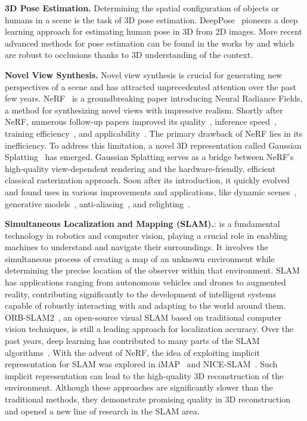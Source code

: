 \vspace{1ex}
\noindent\textbf{3D Pose Estimation.} Determining the spatial configuration of objects or humans in a scene is the task of 3D pose estimation. DeepPose~\citep{toshev2014deeppose} pioneers a deep learning approach for estimating human pose in 3D from 2D images. More recent advanced methods for pose estimation can be found in the works by \cite{zhang20233d} and \cite{zhou2023deep} which are robust to occlusions thanks to 3D understanding of the context.

\vspace{1ex}
\noindent\textbf{Novel View Synthesis.}
Novel view synthesis is crucial for generating new perspectives of a scene and has attracted unprecedented attention over the past few years. NeRF~\citep{mildenhall2020nerf} is a groundbreaking paper introducing Neural Radiance Fields, a method for synthesizing novel views with impressive realism. Shortly after NeRF, numerous follow-up papers improved its quality~\citep{Barron_2021_ICCV, hu2023tri}, inference speed~\citep{fridovich2022plenoxels, garbin2021fastnerf}, training efficiency~\citep{sun2022direct, muller2022instant}, and applicability~\citep{meshry2019neural, park2021nerfies, chan2022efficient}. The primary drawback of NeRF lies in its inefficiency. To address this limitation, a novel 3D representation called Gaussian Splatting~\citep{kerbl20233d} has emerged. Gaussian Splatting serves as a bridge between NeRF's high-quality view-dependent rendering and the hardware-friendly, efficient classical rasterization approach. Soon after its introduction, it quickly evolved and found uses in various improvements and applications, like dynamic scenes~\citep{luiten2023dynamic,yang2023deformable}, generative models~\citep{chen2023text,tang2023dreamgaussian}, anti-aliasing~\citep{yu2023mip}, and relighting~\citep{gao2023relightable}.

\vspace{1ex}
\noindent\textbf{Simultaneous Localization and Mapping (SLAM).}:  is a fundamental technology in robotics and computer vision, playing a crucial role in enabling machines to understand and navigate their surroundings. It involves the simultaneous process of creating a map of an unknown environment while determining the precise location of the observer within that environment. SLAM has applications ranging from autonomous vehicles and drones to augmented reality, contributing significantly to the development of intelligent systems capable of robustly interacting with and adapting to the world around them. ORB-SLAM2~\citep{mur2017orb}, an open-source visual SLAM based on traditional computer vision techniques, is still a leading approach for localization accuracy. Over the past years, deep learning has contributed to many parts of the SLAM algorithms~\citep{mokssit2023deep}. With the advent of NeRF, the idea of exploiting implicit representation for SLAM was explored in iMAP~\citep{sucar2021imap} and NICE-SLAM~\citep{zhu2022nice}. Such implicit representation can lead to the high-quality 3D reconstruction of the environment. Although these approaches are significantly slower than the traditional methods, they demonstrate promising quality in 3D reconstruction and opened a new line of research in the SLAM area.

